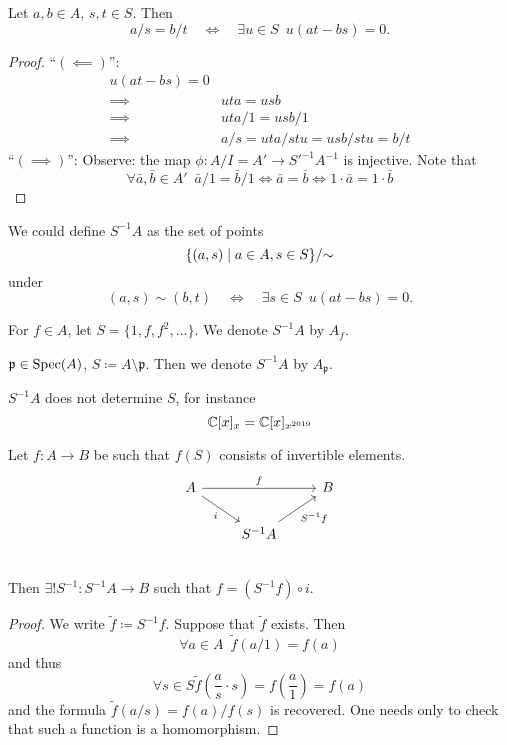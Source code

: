 \begin{lemma}
  Let $a, b \in A$, $s, t \in S$. Then
  \[ a / s = b / t \quad \iff \quad \exists u \in S \enspace u(at-bs)=0.\]
\end{lemma}
\begin{proof}
  ``$(\impliedby)$'':
  \begin{align*}
    u(at - bs) = 0 & \\
    \implies & uta = usb \\
    \implies & uta / 1 = usb / 1 \\
    \implies & a / s = uta / stu = usb / stu = b / t
  \end{align*}
  ``$(\implies)$'': Observe: the map $\phi: A /{I} = A' \to S'^{-1}A^{-1}$ is injective.
  Note that
  \[ \forall \bar a, \bar b \in A' \enspace \bar a / 1 = \bar b / 1 \iff \bar a = \bar b \iff 1 \cdot \bar a = 1 \cdot \bar b \]
\end{proof}

\begin{corollary}
  We could define $S^{-1}A$ as the set of points
  \[ \{ (a, s) \mathrel{|} a \in A, s \in S \} /{\sim}\]
  under
  \[ (a, s) \sim (b, t) \quad \iff \quad \exists s \in S \enspace u(at - bs) = 0.\]
\end{corollary}

\begin{example}
  For $f \in A$, let $S = \{ 1, f, f^2, \ldots \}$. We denote $S^{-1}A$ by $A_f$.
\end{example}

\begin{example}
  $\mathfrak p \in \text{Spec}(A)$,
  $S \coloneqq A \setminus \mathfrak p$.
  Then we denote $S^{-1}A$ by $A_{\mathfrak p}$.
\end{example}

\begin{note}
  $S^{-1}A$ does not determine $S$, for instance
  \[ \mathbb C [x]_x = \mathbb C [x]_{x^{2019}} \]
\end{note}

\begin{prop}
  Let $f: A \to B$ be such that $f(S)$ consists of invertible elements.
\begin{equation*}
  \begin{tikzcd}
    A \arrow{rr}{f} \arrow[swap]{dr}{i}
    & & B \\
    & S^{-1}A \arrow{ru}[swap]{S^{-1}f}
    & \\
  \end{tikzcd}
  \end{equation*}
  Then $\exists ! S^{-1} \colon S^{-1}A \to B$
  such that
  $f = (S^{-1}f) \circ i$.
\end{prop}
\begin{proof}
  We write $\tilde f \coloneqq S^{-1}f$. Suppose that $\tilde f$ exists. Then
  \[ \forall a \in A \enspace \tilde f (a / 1) = f(a) \]
  and thus
  \[ \forall s \in S \tilde f(\frac{a}{s} \cdot s) = f(\frac{a}{1}) = f(a) \]
  and the formula
  $\tilde{f}(a / s) = f(a) / f(s)$
  is recovered.
  One needs only to check that such a function is a homomorphism.
\end{proof}

